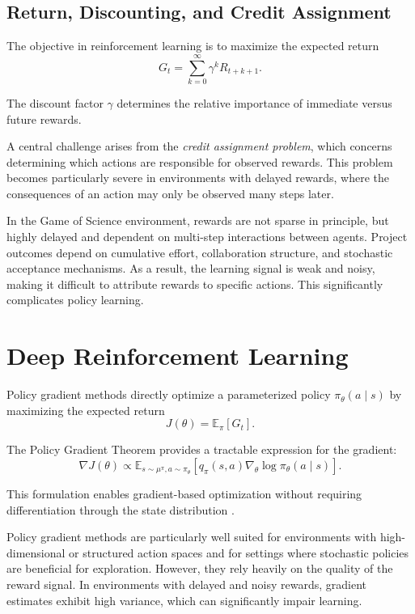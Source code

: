 \documentclass[english,bachelor]{hsluthesis}
\begin{document}
\subsection{Return, Discounting, and Credit Assignment}
The objective in reinforcement learning is to maximize the expected return
\[
G_t = \sum_{k=0}^{\infty} \gamma^k R_{t+k+1}.
\]

The discount factor $\gamma$ determines the relative importance of immediate versus future rewards.

A central challenge arises from the \emph{credit assignment problem}, which concerns determining which actions are responsible for observed rewards. This problem becomes particularly severe in environments with delayed rewards, where the consequences of an action may only be observed many steps later.

In the Game of Science environment, rewards are not sparse in principle, but highly delayed and dependent on multi-step interactions between agents. Project outcomes depend on cumulative effort, collaboration structure, and stochastic acceptance mechanisms. As a result, the learning signal is weak and noisy, making it difficult to attribute rewards to specific actions. This significantly complicates policy learning.



\section{Deep Reinforcement Learning}

Policy gradient methods directly optimize a parameterized policy $\pi_\theta(a \mid s)$ by maximizing the expected return
\[
J(\theta) = \mathbb{E}_\pi[G_t].
\]

The Policy Gradient Theorem provides a tractable expression for the gradient:
\[
\nabla J(\theta)
\propto
\mathbb{E}_{s \sim \mu^\pi, a \sim \pi_\theta}
\left[
q_\pi(s,a)\nabla_\theta \log \pi_\theta(a \mid s)
\right].
\]

This formulation enables gradient-based optimization without requiring differentiation through the state distribution \cite{sutton2018reinforcement}.

Policy gradient methods are particularly well suited for environments with high-dimensional or structured action spaces and for settings where stochastic policies are beneficial for exploration. However, they rely heavily on the quality of the reward signal. In environments with delayed and noisy rewards, gradient estimates exhibit high variance, which can significantly impair learning.
\end{document}
